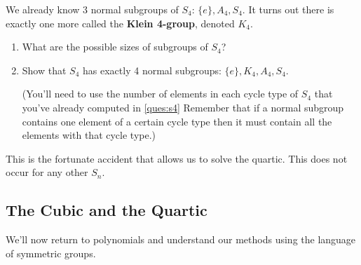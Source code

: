 We already know 3 normal subgroups of $ S_4$: $ \{ e \}, A_4, S_4$. It turns out there is exactly one more called the \textbf{Klein 4-group}, denoted $ K_4$.
\begin{questions}[resume]
  \item \begin{enumerate}
    \item What are the possible sizes of subgroups of $ S_4$?
    \item Show that $ S_4$ has exactly 4 normal subgroups: $ \{ e \}, K_4, A_4, S_4$.
    
     (You'll need to use the number of elements in each cycle type of $ S_4$ that you've already computed in \ref{ques:s4} Remember that if a normal subgroup contains one element of a certain cycle type then it must contain all the elements with that cycle type.)
  \end{enumerate}
\end{questions}
This is the fortunate accident that allows us to solve the quartic. This does not occur for any other $ S_n$.

\begin{comment}
  This is a very nice idea. I wish I had thought of this!
\end{comment}





\newpage
\subsection{The Cubic and the Quartic}
\begin{comment}
  Oh, this is an interesting observation, I had not thought of this. Yes definitely let's put this in somewhere where we introduce symmetry groups.
\end{comment}
\begin{comment}
  I actually do not know either of these two comments very well. If you want to make some problems please go for it, I'll also learn something.
\end{comment}


We'll now return to polynomials and understand our methods using the language of symmetric groups.


